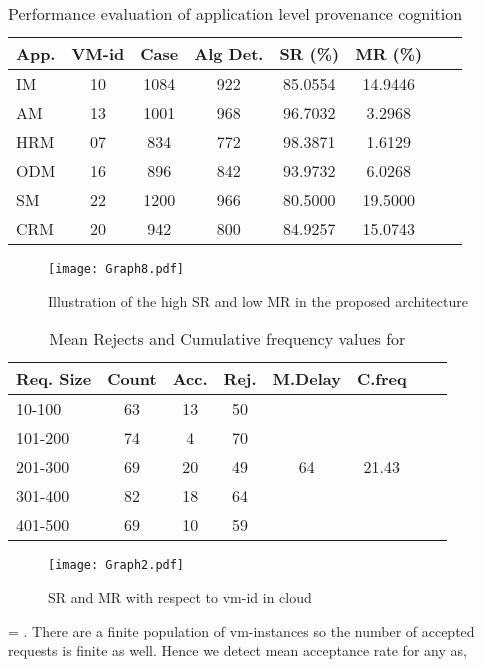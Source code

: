 \documentclass[conference]{IEEEtran}
\begin{document}
\begin{table}
\caption{Performance evaluation of application level provenance cognition }
\begin{tabular}{ l||*{6}{c}r}
\hline
App. & VM-id & Case & Alg Det. & SR (\%) & MR (\%)\\
\hline
IM & 10 & 1084 & 922 & 85.0554 & 14.9446\\
AM & 13 & 1001 & 968 & 96.7032 & 3.2968\\
HRM & 07 & 834 & 772 & 98.3871  & 1.6129\\
ODM & 16 & 896 & 842 & 93.9732 & 6.0268\\
SM & 22 & 1200 & 966 & 80.5000  & 19.5000\\
CRM & 20 & 942 & 800 & 84.9257 & 15.0743\\
\hline
\end{tabular}
\end{table}



\begin{figure}[t!]
\centering
\texttt{[image: Graph8.pdf]}
\caption{Illustration of the high SR and low MR in the proposed architecture}
\label{figure11}
\end{figure}

\begin{table}
\caption{Mean Rejects and Cumulative frequency values for }
\begin{tabular}{ l||*{6}{c}r}
\hline
Req. Size & Count & Acc. & Rej. & M.Delay & C.freq \\
\hline
10-100 & 63 & 13 & 50 & \\
101-200 & 74 & 4 & 70 & \\
201-300 & 69 & 20 & 49 &  64 & 21.43\\
301-400 & 82 & 18 & 64 & \\
401-500 & 69 & 10 & 59 & \\
\hline
\end{tabular}
\end{table}

\begin{figure}[t!]
\centering
\texttt{[image: Graph2.pdf]}
\caption{SR and MR with respect to vm-id in cloud}
\label{figure10}
\end{figure}

 = . There are a finite population of vm-instances so the number of accepted requests is finite as well. Hence we detect mean acceptance rate for any  as,
\end{document}

